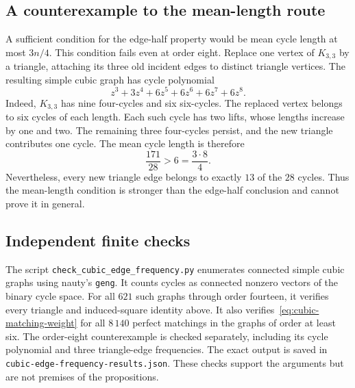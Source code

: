 \subsection{A counterexample to the mean-length route}

A sufficient condition for the edge-half property would be mean cycle length at most $3n/4$.
This condition fails even at order eight.
Replace one vertex of $K_{3,3}$ by a triangle, attaching its three old incident edges to distinct triangle vertices.
The resulting simple cubic graph has cycle polynomial
\[
 z^3+3z^4+6z^5+6z^6+6z^7+6z^8.
\]
Indeed, $K_{3,3}$ has nine four-cycles and six six-cycles.
The replaced vertex belongs to six cycles of each length.
Each such cycle has two lifts, whose lengths increase by one and two.
The remaining three four-cycles persist, and the new triangle contributes one cycle.
The mean cycle length is therefore
\[
 \frac{171}{28}>6=\frac{3\cdot8}{4}.
\]
Nevertheless, every new triangle edge belongs to exactly $13$ of the $28$ cycles.
Thus the mean-length condition is stronger than the edge-half conclusion and cannot prove it in general.

\subsection{Independent finite checks}

The script \texttt{check\_cubic\_edge\_frequency.py} enumerates connected simple cubic graphs using nauty's \texttt{geng}.
It counts cycles as connected nonzero vectors of the binary cycle space.
For all $621$ such graphs through order fourteen, it verifies every triangle and induced-square identity above.
It also verifies~\eqref{eq:cubic-matching-weight} for all $8\,140$ perfect matchings in the graphs of order at least six.
The order-eight counterexample is checked separately, including its cycle polynomial and three triangle-edge frequencies.
The exact output is saved in \texttt{cubic-edge-frequency-results.json}.
These checks support the arguments but are not premises of the propositions.
